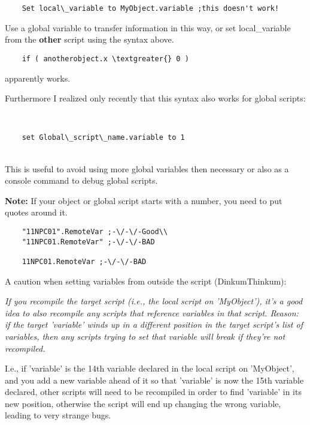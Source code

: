 \begin{lstlisting}
	Set local\_variable to MyObject.variable ;this doesn't work!
\end{lstlisting}

Use a global variable to transfer information in this way, or set
local\_variable from the \textbf{other} script using the syntax above.

\begin{lstlisting}
	if ( anotherobject.x \textgreater{} 0 )
\end{lstlisting}

apparently works.

Furthermore I realized only recently that this syntax also works for
global scripts:\\
\strut \\

\begin{lstlisting}
	set Global\_script\_name.variable to 1
\end{lstlisting}

\strut \\
This is useful to avoid using more global variables then necessary or
also as a console command to debug global scripts.

\textbf{Note:} If your object or global script starts with a number, you
need to put quotes around it.

\begin{lstlisting}
	"11NPC01".RemoteVar ;-\/-\/-Good\\
	"11NPC01.RemoteVar" ;-\/-\/-BAD
	
	11NPC01.RemoteVar ;-\/-\/-BAD
\end{lstlisting}

A caution when setting variables from outside the script
(DinkumThinkum):

\emph{If you recompile the target script (i.e., the local script on
'MyObject'), it's a good idea to also recompile any scripts that
reference variables in that script. Reason: if the target 'variable'
winds up in a different position in the target script's list of
variables, then any scripts trying to set that variable will break if
they're not recompiled.}

I.e., if 'variable' is the 14th variable declared in the local script on
'MyObject', and you add a new variable ahead of it so that 'variable' is
now the 15th variable declared, other scripts will need to be recompiled
in order to find 'variable' in its new position, otherwise the script
will end up changing the wrong variable, leading to very strange bugs.

